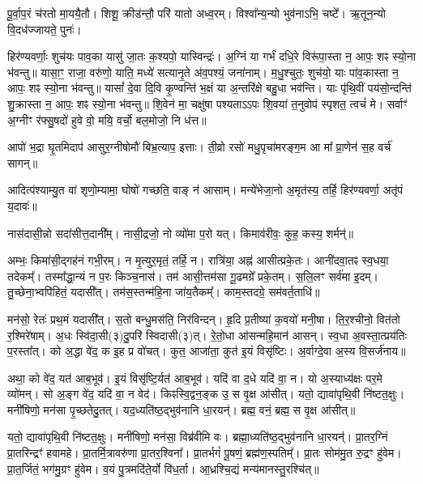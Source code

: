 पू॒र्वा॒प॒रं च॑रतो मा॒ययै॒तौ।
शिशू॒ क्रीड॑न्तौ॒ परि॑ यातो अध्व॒रम्।
विश्वा᳚न्य॒न्यो भुव॑नाऽभि॒ चष्टे᳚।
ऋ॒तून॒न्यो वि॒दध॑ज्जायते॒ पुनः॑।

हिर॑ण्यवर्णाः॒ शुच॑यः पाव॒का यासु॑ जा॒तः क॒श्यपो॒ यास्विन्द्रः॑।
अ॒ग्निं या गर्भं॑ दधि॒रे विरू॑पा॒स्ता न॒ आपः॒ शꣴ स्यो॒ना भ॑वन्तु॥ 
यासा॒ꣳ॒ राजा॒ वरु॑णो॒ याति॒ मध्ये॑ सत्यानृ॒ते अ॑व॒पश्यं॒ जना॑नाम्।
म॒धु॒श्चुतः॒ शुच॑यो॒ याः पा॑व॒कास्ता न॒ आपः॒ शꣴ स्यो॒ना भ॑वन्तु॥ 
यासां᳚ दे॒वा दि॒वि कृ॒ण्वन्ति॑ भ॒क्षं या अ॒न्तरि॑क्षे बहु॒धा भव॑न्ति।
याः पृ॑थि॒वीं पय॑सो॒न्दन्ति॑ शु॒क्रास्ता न॒ आपः॒ शꣴ स्यो॒ना भ॑वन्तु॥ 
शि॒वेन॑ मा॒ चक्षु॑षा पश्यताऽऽपः शि॒वया॑ त॒नुवोप॑ स्पृशत॒ त्वचं॑ मे।
सर्वाꣳ॑ अ॒ग्नीꣳ र॑फ्सु॒षदो॑ हुवे वो॒ मयि॒ वर्चो॒ बल॒मोजो॒ नि ध॑त्त॥

आपो॑ भ॒द्रा घृ॒तमिदाप॑ आसुर॒ग्नीषोमौ॑ बिभ्र॒त्याप॒ इत्ताः।
ती॒व्रो रसो॑ मधु॒पृचा॑मरङ्ग॒म आ मा᳚ प्रा॒णेन॑ स॒ह वर्च॑ सागन्॥

आदित्प॑श्याम्यु॒त वा॑ शृणो॒म्यामा॒ घोषो॑ गच्छति॒ वाङ् न॑ आसाम्।
मन्ये॑भेजा॒नो अ॒मृत॑स्य॒ तर्\mbox{}हि॒ हिर॑ण्यवर्णा॒ अतृ॑पं य॒दावः॑॥


नास॑दासी॒न्नो सदा॑सीत्त॒दानी᳚म्।
नासी॒द्रजो॒ नो व्यो॑मा प॒रो यत्।
किमाव॑रीवः॒ कुह॒ कस्य॒ शर्मन्॑॥

अम्भः॒ किमा॑सी॒द्गह॑नं गभी॒रम्।
न मृ॒त्युर॒मृतं॒ तर्\mbox{}हि॒ न।
रात्रि॑या॒ अह्न॑ आसीत्प्रके॒तः।
आनी॑दवा॒तꣴ स्व॒धया॒ तदेकम्᳚।
तस्मा᳚द्धा॒न्यं न प॒रः किञ्च॒नास॑।
तम॑ आसी॒त्तम॑सा गू॒ढमग्रे᳚ प्रके॒तम्।
स॒लि॒लꣳ सर्व॑मा इ॒दम्।
तु॒च्छेना॒भ्वपि॑हितं॒ यदासी᳚त्।
तम॑स॒स्तन्म॑हि॒ना जा॑य॒तैकम्᳚।
काम॒स्तदग्रे॒ सम॑वर्त॒ताधि॑॥

मन॑सो॒ रेतः॑ प्रथ॒मं यदासी᳚त्।
स॒तो बन्धु॒मस॑ति॒ निर॑विन्दन्।
हृ॒दि प्र॒तीष्या॑ क॒वयो॑ मनी॒षा।
ति॒र॒श्चीनो॒ वित॑तो र॒श्मिरे॑षाम्।
अ॒धः स्वि॑दा॒सी(३)दु॒परि॑ स्विदासी(३)त्।
रे॒तो॒धा आ॑सन्महि॒मान॑ आसन्।
स्व॒धा अ॒वस्ता॒त्प्रय॑तिः प॒रस्ता᳚त्।
को अ॒द्धा वे॑द॒ क इ॒ह प्र वो॑चत्।
कुत॒ आजा॑ता॒ कुत॑ इ॒यं विसृ॑ष्टिः।
अ॒र्वाग्दे॒वा अ॒स्य वि॒सर्ज॑नाय॥

अथा॒ को वे॑द॒ यत॑ आब॒भूव॑।
इ॒यं विसृ॑ष्टि॒र्यत॑ आब॒भूव॑।
यदि॑ वा द॒धे यदि॑ वा॒ न।
यो अ॒स्याध्य॑क्षः पर॒मे व्यो॑मन्।
सो अ॒ङ्ग वे॑द॒ यदि॑ वा॒ न वेद॑।
किꣴस्वि॒द्वन॒ङ्क उ॒ स वृ॒क्ष आ॑सीत्।
यतो॒ द्यावा॑पृथि॒वी नि॑ष्टत॒क्षुः।
मनी॑षिणो॒ मन॑सा पृ॒च्छतेदु॒तत्।
यद॒ध्यति॑ष्ठ॒द्भुव॑नानि धा॒रयन्॑।
ब्रह्म॒ वनं॒ ब्रह्म॒ स वृ॒क्ष आ॑सीत्॥


यतो॒ द्यावा॑पृथि॒वी नि॑ष्टत॒क्षुः।
मनी॑षिणो॒ मन॑सा॒ विब्र॑वीमि वः।
ब्रह्मा॒ध्यति॑ष्ठ॒द्भुव॑नानि धा॒रयन्॑।
प्रा॒तर॒ग्निं प्रा॒तरिन्द्रꣳ॑ हवामहे।
प्रा॒तर्मि॒त्रावरु॑णा प्रा॒तर॒श्विना᳚।
प्रा॒तर्भगं॑ पू॒षणं॒ ब्रह्म॑ण॒स्पतिम्᳚।
प्रा॒तः सोम॑मु॒त रु॒द्रꣳ हु॑वेम।
प्रा॒त॒र्जितं॒ भग॑मु॒ग्रꣳ हु॑वेम।
व॒यं पु॒त्रमदि॑ते॒र्यो वि॑ध॒र्ता।
आ॒ध्रश्चि॒द्यं मन्य॑मानस्तु॒रश्चि॑त्॥

